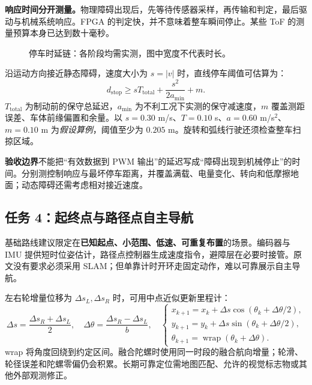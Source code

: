 \documentclass[UTF8,a4paper,zihao=-4,fontset=fandol]{ctexart}
\newcommand{\warn}[2]{\par\smallskip\noindent\colorbox{Warm}{\parbox{\dimexpr\linewidth-2\fboxsep\relax}{\small\textbf{\color{Amber}#1}\quad #2}}\par\smallskip}
\newcommand{\nextpage}{\clearpage}
\begin{document}
\textbf{响应时间分开测量。}物理障碍出现后，先等待传感器采样，再传输和判定，最后驱动与机械系统响应。FPGA 的判定快，并不意味着整车瞬间停止。某些 ToF 的测量预算本身已达到数十毫秒。\cite{tof}

\begin{figure}[H]\centering
{}
\caption{停车时延链：各阶段均需实测，图中宽度不代表时长。}\label{fig:latency}
\end{figure}

沿运动方向接近静态障碍，速度大小为 $s=|v|$ 时，直线停车阈值可估算为：
\[
 d_{\mathrm{stop}}\geq sT_{\mathrm{total}}+\frac{s^2}{2a_{\min}}+m.
\]
$T_{\mathrm{total}}$ 为制动前的保守总延迟，$a_{\min}$ 为不利工况下实测的保守减速度，$m$ 覆盖测距误差、车体前缘偏置和余量。以 $s=0.30$ m/s、$T=0.10$ s、$a=0.60$ m/s$^2$、$m=0.10$ m 为\emph{假设算例}，阈值至少为 $0.205$ m。旋转和弧线行驶还须检查整车扫掠区域。

\warn{验收边界}{不能把“有效数据到 PWM 输出”的延迟写成“障碍出现到机械停止”的时间。分别测控制响应与最坏停车距离，并覆盖满载、电量变化、转向和低摩擦地面；动态障碍还需考虑相对接近速度。}

\nextpage
\subsection{任务 4：起终点与路径点自主导航}

基础路线建议限定在\textbf{已知起点、小范围、低速、可重复布置}的场景。编码器与 IMU 提供短时位姿估计，路径点控制器生成速度指令，避障层在必要时接管。原文没有要求必须采用 SLAM；但单靠计时开环走固定动作，难以可靠展示自主导航。

左右轮增量位移为 $\Delta s_L,\Delta s_R$ 时，可用中点近似更新里程计：
\[
 \Delta s=\frac{\Delta s_R+\Delta s_L}{2},\quad
 \Delta\theta=\frac{\Delta s_R-\Delta s_L}{b},\quad
 \begin{cases}
 x_{k+1}=x_k+\Delta s\cos(\theta_k+\Delta\theta/2),\\
 y_{k+1}=y_k+\Delta s\sin(\theta_k+\Delta\theta/2),\\
 \theta_{k+1}=\operatorname{wrap}(\theta_k+\Delta\theta).
 \end{cases}
\]
wrap 将角度回绕到约定区间。融合陀螺时使用同一时段的融合航向增量；轮滑、轮径误差和陀螺零偏仍会积累。长期可靠定位需地图匹配、允许的视觉标志物或其他外部观测修正。\cite{rep105}
\end{document}
